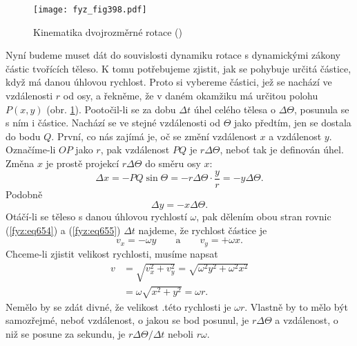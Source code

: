     \begin{figure}[ht!] %
      \centering
      \texttt{[image: fyz\_fig398.pdf]}
      \caption{Kinematika dvojrozměrné rotace (\cite[s.~251]{Feynman01})}
      \label{fyz:fig398}
    \end{figure}
    
    Nyní budeme muset dát do souvislosti dynamiku rotace s dynamickými zákony částic tvořících
    těleso. K tomu potřebujeme zjistit, jak se pohybuje určitá částice, když má danou úhlovou
    rychlost. Proto si vybereme částici, jež se nachází ve vzdálenosti \(r\) od osy, a řekněme, že v
    daném okamžiku má určitou polohu \(P( x, y)\) (obr. \ref{fyz:fig398}). Pootočil-li se za dobu
    \(\Delta t\)  úhel celého tělesa o \(\Delta\varTheta\), posunula se s ním i částice. Nachází se
    ve stejné vzdálenosti od \(\varTheta\) jako předtím, jen se dostala do bodu \(Q\). První, co nás
    zajímá je, oč se změní vzdálenost \(x\) a vzdálenost \(y\). Označíme-li \(OP\) jako \(r\), pak
    vzdálenost \(PQ\) je \(r\Delta\varTheta\), neboť tak je deﬁnován úhel. Změna \(x\) je prostě
    projekcí \(r\Delta\varTheta\) do směru osy \(x\):
    \begin{equation}\label{fyz:eq654}
      Δx=−PQ\sin\varTheta =−rΔ\varTheta\cdot\frac{y}{r}=−yΔ\varTheta.
    \end{equation}
    Podobně
    \begin{equation}\label{fyz:eq655}
      Δy=−x\Delta\varTheta.
    \end{equation}
    Otáčí-li se těleso s danou úhlovou rychlostí \(\omega\), pak dělením obou stran rovnic
    (\ref{fyz:eq654}) a (\ref{fyz:eq655}) \(\Delta t\) najdeme, že rychlost částice je
    \begin{equation}\label{fyz:eq656}
      v_x=−ωy \qquad\text{a}\qquad v_y=+ωx.
    \end{equation}
    Chceme-li zjistit velikost rychlosti, musíme napsat
    \begin{align}
      v&=\sqrt{v^2_x+v^2_y}=\sqrt{ω^2y^2+ω^2x^2} \nonumber\\
       &=ω\sqrt{x^2+y^2}=ωr.                     \label{fyz:eq657}
    \end{align}
    Nemělo by se zdát divné, že velikost .této rychlosti je \(\omega r\). Vlastně by to mělo být
    samozřejmé, neboť vzdálenost, o jakou se bod posunul, je  \(rΔ\varTheta\) a vzdálenost, o niž se
    posune za sekundu, je \(rΔ\varTheta/Δt\) neboli \(r\omega\).

